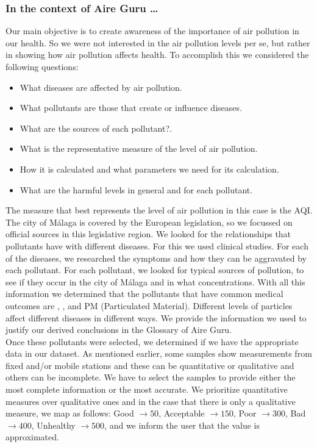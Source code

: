 \subsubsection*{In the context of Aire Guru \ldots}

Our main objective is to create awareness of the importance of air pollution in our health.
So we were not interested in the air pollution levels per se, but rather in showing how air pollution affects health.
To accomplish this we considered the following questions:

\begin{itemize}
    \item What diseases are affected by air pollution.
    \item What pollutants are those that create or influence diseases.
    \item What are the sources of each pollutant?.
    \item What is the representative measure of the level of air pollution.
    \item How it is calculated and what parameters we need for its calculation.
    \item What are the harmful levels in general and for each pollutant.
\end{itemize}

The measure that best represents the level of air pollution in this case is the AQI.
The city of Málaga is covered by the European legislation, so we focussed on official sources in this legislative region.
We looked for the relationships that pollutants have with different diseases.
For this we used clinical studies.
For each of the diseases, we researched the symptoms and how they can be aggravated by each pollutant.
For each pollutant, we looked for typical sources of pollution, to see if they occur in the city of Málaga and in what concentrations.
With all this information we determined that the pollutants that have common medical outcomes are , ,  and PM (Particulated Material).
Different levels of particles affect different diseases in different ways.
We provide the information we used to justify our derived conclusions in the Glossary of Aire Guru. \\

Once these pollutants were selected, we determined if we have the appropriate data in our dataset.
As mentioned earlier, some samples show measurements from fixed and/or mobile stations and these can be quantitative or qualitative and others can be incomplete.
We have to select the samples to provide either the most complete information or the most accurate.
We prioritize quantitative measures over qualitative ones and in the case that there is only a qualitative measure, we map as follows:
Good $\rightarrow 50$, Acceptable $\rightarrow 150$, Poor $\rightarrow 300$, Bad $\rightarrow 400$, Unhealthy $\rightarrow 500$,
and we inform the user that the value is approximated.\\

